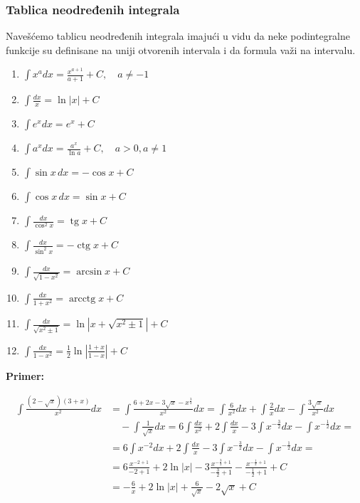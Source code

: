 \documentclass[a4paper,12pt,twoside]{report}
\numberwithin{algorithm}{section}
\begin{document}
\subsubsection{Tablica neodređenih integrala}
Navešćemo tablicu neodređenih integrala imajući u vidu da neke podintegralne funkcije su definisane na uniji otvorenih intervala i da formula važi na intervalu.

\begin{enumerate}[label=\arabic*)]
    \item \(\displaystyle \int x^a dx = \frac{x^{a+1}}{a+1} + C, \quad a \neq -1\)
    \item \(\displaystyle \int \frac{dx}{x} = \ln|x| + C\)
    \item \(\displaystyle \int e^x dx = e^x + C\)
    \item \(\displaystyle \int a^x dx = \frac{a^x}{\ln a} + C, \quad a > 0, a \neq 1\)
    \item \(\displaystyle \int \sin x \, dx = -\cos x + C\)
    \item \(\displaystyle \int \cos x \, dx = \sin x + C\)
    \item \(\displaystyle \int \frac{dx}{\cos^2 x} = \operatorname{tg} x + C\)
    \item \(\displaystyle \int \frac{dx}{\sin^2 x} = -\operatorname{ctg} x + C\)
    \item \(\displaystyle \int \frac{dx}{\sqrt{1-x^2}} = \arcsin x + C\)
    \item \(\displaystyle \int \frac{dx}{1+x^2} = \operatorname{arcctg} x + C\)
    \item \(\displaystyle \int \frac{dx}{\sqrt{x^2 \pm 1}} = \ln|x + \sqrt{x^2 \pm 1}| + C\)
    \item \(\displaystyle \int \frac{dx}{1-x^2} = \frac{1}{2} \ln\left|\frac{1+x}{1-x}\right| + C\)
\end{enumerate}

\noindent \textbf{Primer:}

\begin{align*}
\int \frac{(2-\sqrt{x})(3+x)}{x^2} dx &= \int \frac{6+2x-3\sqrt{x}-x^{\frac{3}{2}}}{x^2} dx = \int \frac{6}{x^2} dx + \int \frac{2}{x} dx - \int \frac{3\sqrt{x}}{x^2} dx \\
&\quad - \int \frac{1}{\sqrt{x}} dx = 6 \int \frac{dx}{x^2} + 2 \int \frac{dx}{x} - 3 \int x^{-\frac{3}{2}} dx - \int x^{-\frac{1}{2}} dx = \\
&= 6 \int x^{-2} dx + 2 \int \frac{dx}{x} - 3 \int x^{-\frac{3}{2}} dx - \int x^{-\frac{1}{2}} dx = \\
&= 6 \frac{x^{-2+1}}{-2+1} + 2 \ln|x| - 3 \frac{x^{-\frac{3}{2}+1}}{-\frac{3}{2}+1} - \frac{x^{-\frac{1}{2}+1}}{-\frac{1}{2}+1} + C \\
&= - \frac{6}{x} + 2 \ln|x| + \frac{6}{\sqrt{x}} - 2\sqrt{x} + C
\end{align*}
\end{document}
